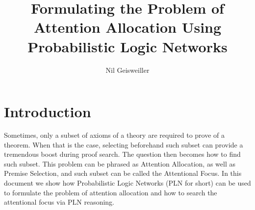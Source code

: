 \documentclass{easychair}
\title{Formulating the Problem of Attention Allocation Using
  Probabilistic Logic Networks}
\author{Nil Geisweiller}
\institute{
  SingularityNET Foundation,\\
  Zug, Switzerland\\
  \email{nil@singularitynet.io}
}
\begin{document}
\maketitle


\section{Introduction}

Sometimes, only a subset of axioms of a theory are required to prove
of a theorem.  When that is the case, selecting beforehand such subset
can provide a tremendous boost during proof search.  The question then
becomes how to find such subset.  This problem can be phrased as
Attention Allocation, as well as Premise Selection, and such subset
can be called the Attentional Focus.  In this document we show how
Probabilistic Logic Networks (PLN for short) can be used to formulate
the problem of attention allocation and how to search the attentional
focus via PLN reasoning.

\newpage



\label{sect:bib}
%
%
%


\newpage


\appendix

\end{document}
